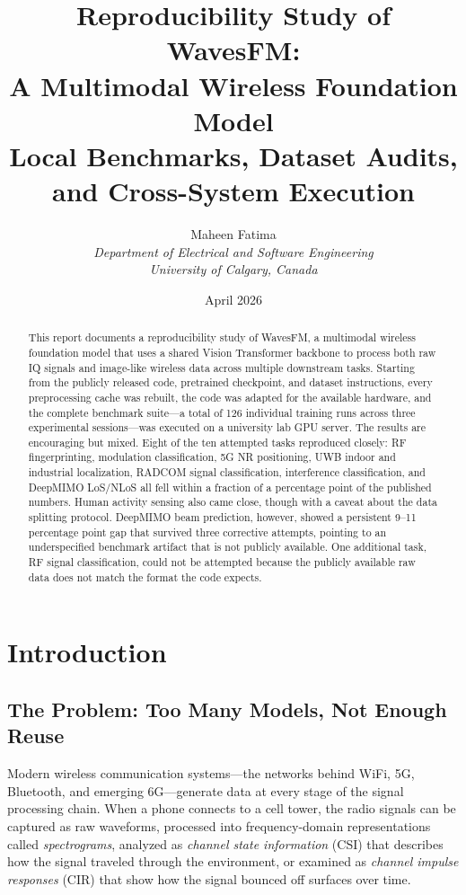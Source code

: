 \documentclass[11pt]{article}
\title{
    \textbf{Reproducibility Study of WavesFM:\\A Multimodal Wireless Foundation Model}\\[0.4cm]
    \large Local Benchmarks, Dataset Audits, and Cross-System Execution
}
\author{
    Maheen Fatima\\
    \textit{Department of Electrical and Software Engineering}\\
    \textit{University of Calgary, Canada}
}
\date{April 2026}
\begin{document}
\maketitle

\begin{abstract}
This report documents a reproducibility study of WavesFM, a multimodal wireless foundation model that uses a shared Vision Transformer backbone to process both raw IQ signals and image-like wireless data across multiple downstream tasks. Starting from the publicly released code, pretrained checkpoint, and dataset instructions, every preprocessing cache was rebuilt, the code was adapted for the available hardware, and the complete benchmark suite---a total of 126 individual training runs across three experimental sessions---was executed on a university lab GPU server. The results are encouraging but mixed. Eight of the ten attempted tasks reproduced closely: RF fingerprinting, modulation classification, 5G NR positioning, UWB indoor and industrial localization, RADCOM signal classification, interference classification, and DeepMIMO LoS/NLoS all fell within a fraction of a percentage point of the published numbers. Human activity sensing also came close, though with a caveat about the data splitting protocol. DeepMIMO beam prediction, however, showed a persistent 9--11 percentage point gap that survived three corrective attempts, pointing to an underspecified benchmark artifact that is not publicly available. One additional task, RF signal classification, could not be attempted because the publicly available raw data does not match the format the code expects.
\end{abstract}

\newpage
\tableofcontents
\newpage

\section{Introduction}
\label{sec:intro}

\subsection{The Problem: Too Many Models, Not Enough Reuse}

Modern wireless communication systems---the networks behind WiFi, 5G, Bluetooth, and emerging 6G---generate data at every stage of the signal processing chain. When a phone connects to a cell tower, the radio signals can be captured as raw waveforms, processed into frequency-domain representations called \textit{spectrograms}, analyzed as \textit{channel state information} (CSI) that describes how the signal traveled through the environment, or examined as \textit{channel impulse responses} (CIR) that show how the signal bounced off surfaces over time.
\end{document}
